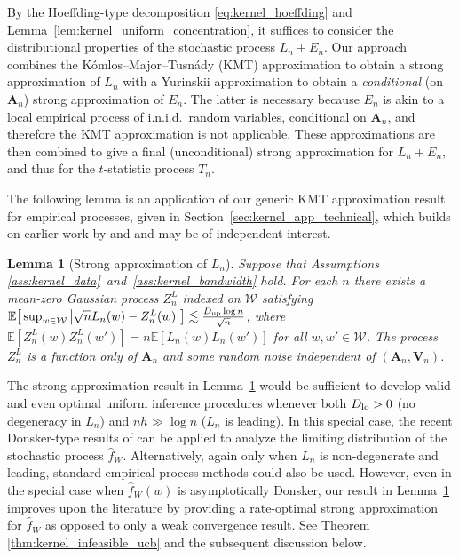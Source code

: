 \documentclass[11pt,lof]{puthesis}
\newcommand{\E}{\ensuremath{\mathbb{E}}}
\newcommand{\bA}{\ensuremath{\mathbf{A}}}
\newcommand{\bV}{\ensuremath{\mathbf{V}}}
\newcommand{\cW}{\ensuremath{\mathcal{W}}}
\newcommand{\Dl}{\ensuremath{D_{\textup{lo}}}}
\newcommand{\Du}{\ensuremath{D_{\textup{up}}}}
\theoremstyle{break}
\newtheorem{lemma}{Lemma}[section]
\theoremstyle{proof}
\begin{document}
By the Hoeffding-type decomposition \eqref{eq:kernel_hoeffding} and
Lemma~\ref{lem:kernel_uniform_concentration}, it suffices to consider the
distributional properties of the stochastic process $L_n + E_n$.
Our approach combines the K{\'o}mlos--Major--Tusn{\'a}dy (KMT) approximation
\citep{komlos1975approximation} to obtain a strong approximation of $L_n$ with
a Yurinskii approximation \citep{yurinskii1978error} to obtain a
\emph{conditional} (on $\bA_n$) strong approximation of $E_n$. The latter is
necessary because $E_n$ is akin to a local empirical process of i.n.i.d.\
random variables, conditional on $\bA_n$, and therefore the KMT approximation
is not applicable. These approximations are then combined to give a final
(unconditional) strong approximation for $L_n+E_n$, and thus for the
$t$-statistic process $T_n$.

The following lemma is an application of our generic KMT approximation result
for empirical processes, given in Section~\ref{sec:kernel_app_technical}, which
builds on earlier work by \citet{gine2004kernel} and \citet{gine2010confidence}
and may be of independent interest.

\begin{lemma}[Strong approximation of $L_n$]
  \label{lem:kernel_strong_approx_Ln}
  Suppose that Assumptions \ref{ass:kernel_data}~and~\ref{ass:kernel_bandwidth}
  hold. For each $n$ there exists a mean-zero Gaussian process $Z^L_n$ indexed
  on $\cW$ satisfying
  $\E\big[ \sup_{w \in \cW} \big| \sqrt{n} L_n(w) - Z_n^L(w) \big| \big]
  \lesssim \frac{\Du \log n}{\sqrt{n}}$, where
  $\E[Z_n^L(w)Z_n^L(w')] = n\E[L_n(w)L_n(w')]$ for all $w, w' \in \cW$. The
  process $Z_n^L$ is a function only of $\bA_n$ and some random noise
  independent of $(\bA_n, \bV_n)$.
\end{lemma}

The strong approximation result in Lemma~\ref{lem:kernel_strong_approx_Ln}
would be
sufficient to develop valid and even optimal uniform inference procedures
whenever both $\Dl > 0$ (no degeneracy in $L_n$) and $n h \gg \log n$
($L_n$ is leading). In this special case, the recent Donsker-type results of
\citet{davezies2021exchangeable} can be applied to analyze the limiting
distribution of the stochastic process $\hat{f}_W$. Alternatively, again only
when $L_n$ is non-degenerate and leading, standard empirical process methods
could also be used. However, even in the special case when $\hat{f}_W(w)$ is
asymptotically Donsker, our result in Lemma~\ref{lem:kernel_strong_approx_Ln}
improves
upon the literature by providing a rate-optimal strong approximation for
$\hat{f}_W$ as opposed to only a weak convergence result. See Theorem
\ref{thm:kernel_infeasible_ucb} and the subsequent discussion below.
\end{document}
